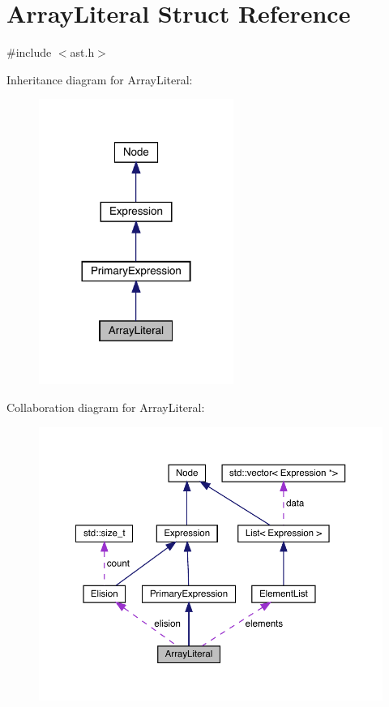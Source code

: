 \hypertarget{struct_array_literal}{}\section{Array\+Literal Struct Reference}
\label{struct_array_literal}


{\ttfamily \#include $<$ast.\+h$>$}



Inheritance diagram for Array\+Literal\+:\nopagebreak
\begin{figure}[H]
\begin{center}
\leavevmode
\includegraphics[width=180pt]{struct_array_literal__inherit__graph}
\end{center}
\end{figure}


Collaboration diagram for Array\+Literal\+:\nopagebreak
\begin{figure}[H]
\begin{center}
\leavevmode
\includegraphics[width=350pt]{struct_array_literal__coll__graph}
\end{center}
\end{figure}
